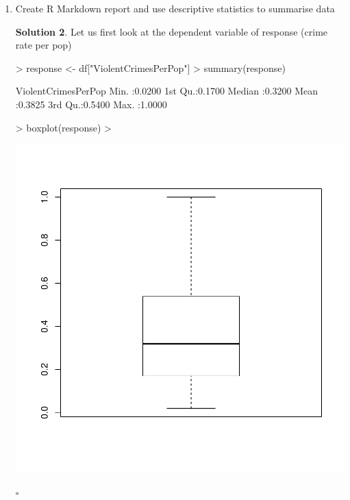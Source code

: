 \documentclass[twoside]{article}
\theoremstyle{definition}
\newtheorem*{solutionT}{Solution}
\newenvironment{solution}{\begin{cBox}\begin{solutionT}}{\hfill{\scriptsize\ensuremath{\square}}\end{solutionT}\end{cBox}}
\theoremstyle{definition}
\begin{document}
\begin{enumerate}
\begin{solution}
\begin{Schunk}
\begin{Sinput}
> df <- na.omit(df)
\end{Sinput}
\end{Schunk}


\end{solution}


\item Create R Markdown report and use descriptive statistics to summarise data
\begin{solution}
Let us first look at the dependent variable of response (crime rate per pop)
\begin{Schunk}
\begin{Sinput}
> response <- df["ViolentCrimesPerPop"]
> summary(response)
\end{Sinput}
\begin{Soutput}
 ViolentCrimesPerPop
 Min.   :0.0200     
 1st Qu.:0.1700     
 Median :0.3200     
 Mean   :0.3825     
 3rd Qu.:0.5400     
 Max.   :1.0000     
\end{Soutput}
\begin{Sinput}
> boxplot(response)
> 
\end{Sinput}
\end{Schunk}
\includegraphics{week1-018}
\begin{Schunk}
\begin{Sinput}

\end{Sinput}
\end{Schunk}
\end{solution}
\end{enumerate}
\end{document}
